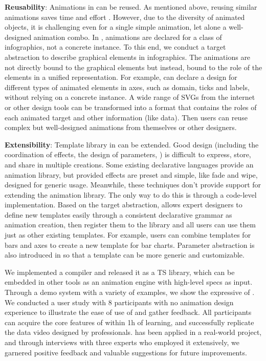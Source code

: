 \textbf{Reusability}: Animations in \gaia{} can be reused.
As mentioned above, reusing similar animations saves time and effort \cite{jahanlou2022katika}.
However, due to the diversity of animated objects, it is challenging even for a single simple animation, let alone a well-designed animation combo.
In \gaia{}, animations are declared for a class of infographics, not a concrete instance.
To this end, we conduct a target abstraction to describe graphical elements in infographics.
The animations are not directly bound to the graphical elements but instead, bound to the role of the elements in a unified representation.
For example, \gaia{} can declare a design for different types of animated elements in axes, such as domain, ticks and labels, without relying on a concrete instance.
A wide range of SVGs from the internet or other design tools can be transformed into a format that contains the roles of each animated target and other information (like data). 
Then users can reuse complex but well-designed animations from themselves or other designers.

\textbf{Extensibility}: Template library in \gaia{} can be extended.
Good design (including the coordination of effects, the design of parameters, \etcns) is difficult to express, store, and share in multiple creations.
Some existing declarative languages provide an animation library, but provided effects are preset and simple, like fade and wipe, designed for generic usage.
Meanwhile, these techniques don't provide support for extending the animation library. The only way to do this is through a code-level implementation.
Based on the target abstraction, \gaia{} allows expert designers to define new templates easily through a consistent declarative grammar as animation creation, then register them to the library and all users can use them just as other existing templates. 
For example, users can combine templates for bars and axes to create a new template for bar charts. 
Parameter abstraction is also introduced in \gaia{} so that a template can be more generic and customizable.

We implemented a \gaia{} compiler and released it as a TS library, which can be embedded in other tools as an animation engine with high-level specs as input.
Through a demo system with a variety of examples, we show the expressive of \gaia{}.
We conducted a user study with 8 participants with no animation design experience to illustrate the ease of use of \gaia{} and gather feedback.
All participants can acquire the core features of \gaia{} within 1h of learning, and successfully replicate the data video designed by professionals.
\gaia{} has been applied in a real-world project, and through interviews with three experts who employed it extensively, we garnered positive feedback and valuable suggestions for future improvements.


